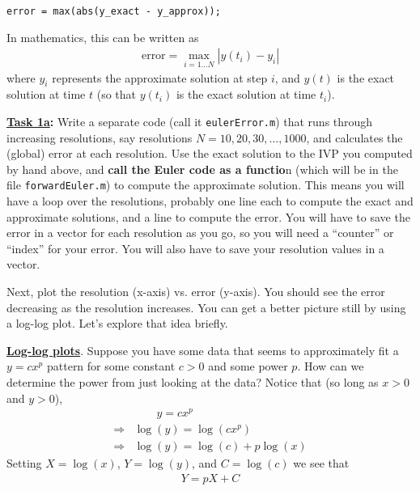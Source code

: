 \documentclass[10pt,reqno]{amsart}
\theoremstyle{plain}
\theoremstyle{definition}
\theoremstyle{remark}
\numberwithin{figure}{section}   %
\begin{document}
\begin{minipage}[h]{5in}
\centering
\begin{lstlisting}
error = max(abs(y_exact - y_approx));
\end{lstlisting}
\end{minipage}

\noindent In mathematics, this can be written as
\begin{align*}
 \text{error} = \max_{i = 1\ldots N} |y(t_i) - y_i|
\end{align*}
\noindent
where $y_i$ represents the approximate solution at step $i$, and $y(t)$ is the exact solution at time $t$ (so that $y(t_i)$ is the exact solution at time $t_i$).

\bigskip

\noindent\textbf{\underline{Task 1a}:} Write a separate code (call it \texttt{eulerError.m}) that runs through increasing resolutions, say resolutions $N=10,20,30,\ldots,1000$, and calculates the (global) error at each resolution.  Use the exact solution to the IVP you computed by hand above, and \textbf{call the Euler code as a functio}n (which will be in the file \texttt{forwardEuler.m}) to compute the approximate solution.  This means you will have a loop over the resolutions, probably one line each to compute the exact and approximate solutions, and a line to compute the error.  You will have to save the error in a vector for each resolution as you go, so you will need a ``counter'' or ``index'' for your error.   You will also have to save your resolution values in a vector.

Next, plot the resolution (x-axis) vs. error (y-axis).  You should see the error decreasing as the resolution increases.  You can get a better picture still by using a log-log plot.  Let's explore that idea briefly.

\pagebreak

\noindent\textbf{\underline{Log-log plots}}.  Suppose you have some data that seems to approximately fit a $y=cx^{p}$ pattern for some constant $c>0$ and some power $p$.  How can we determine the power from just looking at the data?  Notice that (so long as $x>0$ and $y>0$),
\begin{align*}
 &\qquad y=cx^{p}
 \\\Rightarrow
 &\log(y)=\log(cx^{p})
  \\\Rightarrow
 &\log(y)=\log(c)+p\log(x)
\end{align*}
Setting $X = \log(x)$, $Y = \log(y)$, and $C = \log(c)$ we see that 
\begin{align*}
 Y=pX + C
\end{align*}
\end{document}
